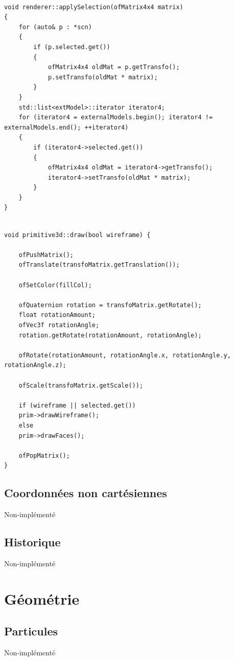 \begin{lstlisting}

void renderer::applySelection(ofMatrix4x4 matrix)
{
	for (auto& p : *scn)
	{
		if (p.selected.get())
		{
			ofMatrix4x4 oldMat = p.getTransfo();
			p.setTransfo(oldMat * matrix);
		}
	}
	std::list<extModel>::iterator iterator4;
	for (iterator4 = externalModels.begin(); iterator4 != externalModels.end(); ++iterator4)
	{
		if (iterator4->selected.get())
		{
			ofMatrix4x4 oldMat = iterator4->getTransfo();
			iterator4->setTransfo(oldMat * matrix);
		}
	}
}
\end{lstlisting}

\begin{lstlisting}

void primitive3d::draw(bool wireframe) {

	ofPushMatrix();
	ofTranslate(transfoMatrix.getTranslation());
	
	ofSetColor(fillCol);
	
	ofQuaternion rotation = transfoMatrix.getRotate();
	float rotationAmount;
	ofVec3f rotationAngle;
	rotation.getRotate(rotationAmount, rotationAngle);
	
	ofRotate(rotationAmount, rotationAngle.x, rotationAngle.y, rotationAngle.z);
	
	ofScale(transfoMatrix.getScale());
	
	if (wireframe || selected.get())
	prim->drawWireframe();
	else
	prim->drawFaces();
	
	ofPopMatrix();
}

\end{lstlisting}

\subsection{Coordonnées non cartésiennes}
Non-implémenté

\subsection{Historique}
Non-implémenté

\pagebreak
\section{Géométrie}
\subsection{Particules}
Non-implémenté

